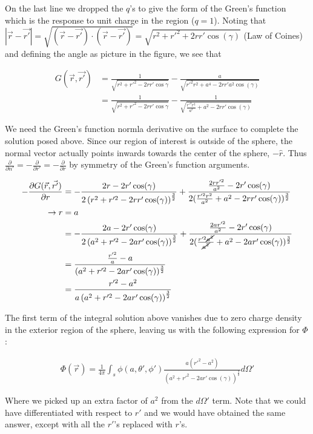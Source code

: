 \documentclass[paper=a4, fontsize=11pt]{scrartcl} %
\newcommand{\scrr}{\vec{r} - \vec{r'}}
\numberwithin{equation}{section} %
\numberwithin{figure}{section} %
\numberwithin{table}{section} %
\begin{document}
On the last line we dropped the $q$'s to give the form of the Green's function which is the response to unit charge in the region ($q=1$). Noting that $|\scrr| = \sqrt{(\scrr) \cdot (\scrr)} = \sqrt{r^2 + r'^2 + 2rr'\cos(\gamma)}$ (Law of Coines) and defining the angle as picture in the figure, we see that  

\begin{align}
G(\vec{r},\vec{r'}) &= \frac{1}{\sqrt{r^2 + r'^2 - 2rr'\cos{\gamma}}} - \frac{a}{\sqrt{r'^2r^2 + a^4 - 2rr'a^2\cos(\gamma)}} \\
&= \frac{1}{\sqrt{r^2 + r'^2 - 2rr'\cos{\gamma}}} - \frac{1}{\sqrt{\frac{r'^2 r^2}{a^2} + a^2 - 2 rr'\cos(\gamma)}}
\end{align}

We need the Green's function normla derivative on the surface to complete the solution posed above. Since our region of interest is outside of the sphere, the normal vector actually points inwards towards the center of the sphere, $-\hat{r}$. Thus $\frac{\partial}{\partial n'} = -\frac{\partial}{\partial r'} = -\frac{\partial}{\partial r}$ by symmetry of the Green's function arguments. 

\begin{align}
-\frac{\partial G(\vec{r},\vec{r'})}{\partial r} &= -\frac{2r - 2r'\cos(\gamma)}{2\left(r^2 + r'^2 - 2rr'\cos(\gamma)\right)^{\frac{3}{2}}} + \frac{\frac{2rr'^2}{a^2} - 2r'\cos(\gamma)}{2(\frac{r'^2r^2}{a^2} + a^2 - 2 r r' \cos(\gamma))^{\frac{3}{2}}} \\
\rightarrow  r &= a \\
&= -\frac{2a - 2r'\cos(\gamma)}{2\left(a^2 + r'^2 - 2ar'\cos(\gamma)\right)^{\frac{3}{2}}} + \frac{\frac{2ar'^2}{a^2} - 2r'\cos(\gamma)}{2(\frac{r'^2\cancel{a^2}}{\cancel{a^2}} + a^2 - 2 a r' \cos(\gamma))^{\frac{3}{2}}} \\
&= \frac{\frac{r'^2}{a} - a}{(a^2 + r'^2 - 2 a r' \cos(\gamma))^{\frac{3}{2}}} \\
&= \frac{r'^2 - a^2}{a\left(a^2 + r'^2 - 2 a r' \cos(\gamma)\right)^{\frac{3}{2}}}
\end{align}

The first term of the integral solution above vanishes due to zero charge density in the exterior region of the sphere, leaving us with the following expression for $\Phi$:

\begin{align}
\Phi(\vec{r}) = \frac{1}{4 \pi}\int_s \phi(a, \theta', \phi')\frac{a(r'^2 - a^2)}{\left(a^2 + r'^2 - 2 a r' \cos(\gamma)\right)^{\frac{3}{2}}}d\Omega'
\end{align}

Where we picked up an extra factor of $a^2$ from the $d\Omega'$ term. Note that we could have differentiated with respect to $r'$ and we would have obtained the same answer, except with all the $r'$'s replaced with $r$'s.
\end{document}

